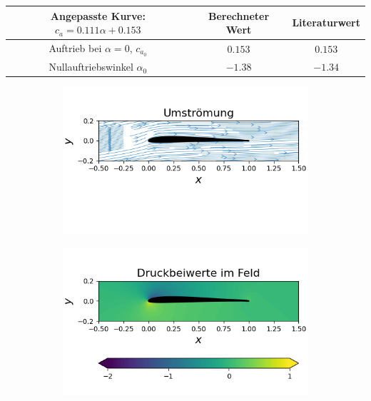 \begin{table}[H]
\label{tab:sc20614cawerte}
\begin{center}
\begin{tabular}{c|cc}
Angepasste Kurve: $c_a = 0.111 \alpha + 0.153$ & Berechneter Wert & Literaturwert \cite{bigfoil} \\
\midrule
Auftrieb bei $\alpha = 0$, $c_{a_0}$ & $0.153$ & $0.153$ \\
Nullauftriebswinkel $\alpha_{0}$ & $-1.38$ & $-1.34$ 
\end{tabular}
\end{center}
\end{table}

\begin{figure}[!ht]
  \centering
  \begin{subfigure}[b]{0.475\linewidth}
    \centering\includegraphics[scale=0.5]{figures/z40stream.png} 
  \end{subfigure}
  \hfill
  \begin{subfigure}[b]{0.475\linewidth}
    \centering\includegraphics[scale=0.5]{figures/z40contourcp.png} 

\end{subfigure}
\end{figure}
